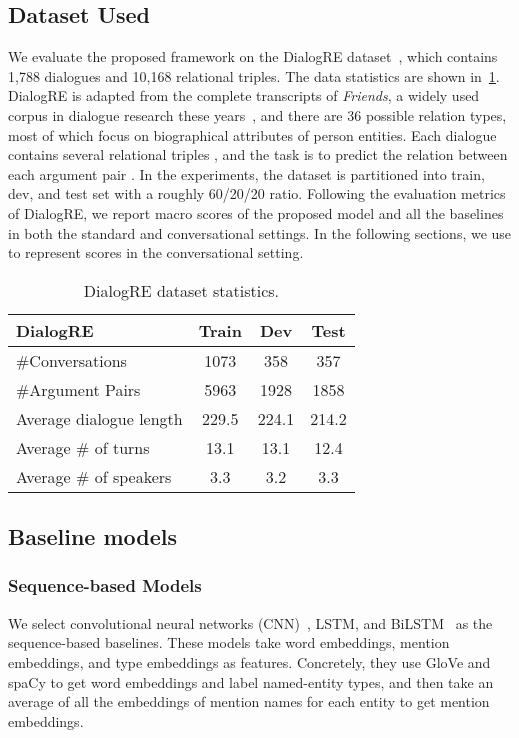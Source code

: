\documentclass[11pt]{article}
\begin{document}
\subsection{Dataset Used}
We evaluate the proposed framework on the DialogRE dataset~\cite{yu2020dialogue}, which contains 1,788 dialogues and 10,168 relational triples. The data statistics are shown in~\cref{tab:dataset}. DialogRE is adapted from the complete transcripts of \textit{Friends}, a widely used corpus in dialogue research these years~\cite{chen-etal-2017-robust,zhou2018they,yang2019friendsqa,poria2019meld}, and there are 36 possible relation types, most of which focus on biographical attributes of person entities. Each dialogue contains several relational triples , and the task is to predict the relation  between each argument pair . In the experiments, the dataset is partitioned into train, dev, and test set with a roughly 60/20/20 ratio. Following the evaluation metrics of DialogRE, we report macro  scores of the proposed model and all the baselines in both the standard and conversational settings. In the following sections, we use  to represent  scores in the conversational setting. 

\begin{table}[ht]
\centering
\begin{tabular}{l|c|c|c}
\toprule
 DialogRE & Train & Dev & Test \\
\midrule
\#Conversations & 1073 & 358 & 357 \\
\#Argument Pairs & 5963 & 1928 & 1858 \\
Average dialogue length & 229.5 & 224.1 & 214.2\\
Average \# of turns & 13.1 & 13.1 & 12.4 \\
Average \# of speakers & 3.3 & 3.2 & 3.3 \\
\bottomrule
\end{tabular}
\caption{DialogRE dataset statistics.}
\label{tab:dataset}
\end{table}


\subsection{Baseline models}
\subsubsection{Sequence-based Models}
We select convolutional neural networks (CNN)~\cite{zeng2014relation}, LSTM, and BiLSTM~\cite{cai2016bidirectional} as the sequence-based baselines. These models take word embeddings, mention embeddings, and type embeddings as features. Concretely, they use GloVe and spaCy to get word embeddings and label named-entity types, and then take an average of all the embeddings of mention names for each entity to get mention embeddings.
\end{document}
